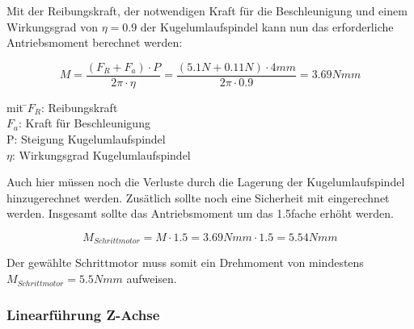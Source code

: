 \begin{itemize}
Mit der Reibungskraft, der notwendigen Kraft für die Beschleunigung und einem Wirkungsgrad von $\eta=0.9$ der Kugelumlaufspindel kann nun das erforderliche Antriebsmoment berechnet werden: 

\[M=\dfrac{(F_R + F_a) \cdot P}{2\pi \cdot \eta}=\dfrac{(5.1N+0.11N)\cdot 4mm}{2\pi \cdot 0.9}= 3.69Nmm\]

\begin{tabbing}
mit \=$F_R$: Reibungskraft\\
		\>$F_a$: Kraft für Beschleunigung\\
		\>P: Steigung Kugelumlaufspindel\\
		\>$\eta$: Wirkungsgrad Kugelumlaufspindel\\
		
\end{tabbing}

Auch hier müssen noch die Verluste durch die Lagerung der Kugelumlaufspindel hinzugerechnet werden. Zusätlich sollte noch 
eine Sicherheit mit eingerechnet werden. Insgesamt sollte das Antriebsmoment um das 1.5fache erhöht werden.

\[M_{Schrittmotor}=M \cdot 1.5 = 3.69Nmm \cdot 1.5 = 5.54Nmm\]

		
Der gewählte Schrittmotor muss somit ein Drehmoment von mindestens $M_{Schrittmotor} = 5.5Nmm$ aufweisen.


\end{itemize}


\newpage

\subsubsection{Linearführung Z-Achse}

